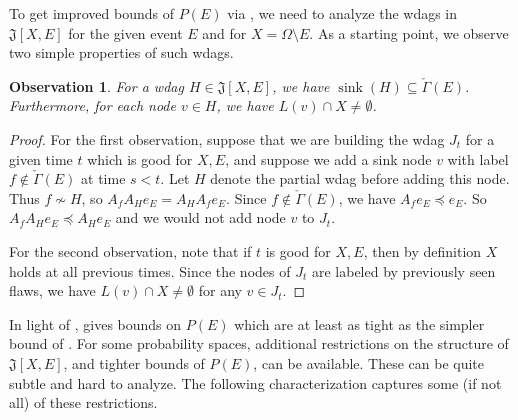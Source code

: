 \documentclass{toc}
\DeclareMathOperator{\sink}{sink}
\newtheorem{observation}[theorem]{Observation}
\begin{document}
To get improved bounds of $P(E)$ via , we need to analyze the wdags in $\mathfrak J[X, E]$ for the given event $E$ and for $X = \Omega \setminus E$. As a starting point, we observe two simple properties of such wdags.
\begin{observation}
\label{character-prop0}
For a wdag $H \in \mathfrak J[X,E]$, we have $\sink(H) \subseteq \check \Gamma(E)$. Furthermore, for each node $v \in H$, we have $L(v) \cap X \neq \emptyset$.
\end{observation}
\begin{proof}
For the first observation, suppose that we are building the wdag $J_t$ for a given time $t$ which is good for $X,E$, and suppose we add a sink node $v$ with label $f \notin \check \Gamma(E)$ at time $s < t$. Let $H$ denote the partial wdag before adding this node. Thus $f \not \sim H$, so $A_f A_H e_E = A_H A_f e_E$. Since $f \notin \check \Gamma(E)$, we have $A_f e_E \preceq e_E$. So $A_f A_H e_E \preceq A_H e_E$ and we would not add node $v$ to $J_t$.

For the second observation, note that if $t$ is good for $X, E$,  then by definition $X$ holds at all previous times. Since the nodes of $J_t$ are labeled by previously seen flaws, we have $L(v) \cap  X \neq \emptyset$ for any $v \in J_t$.
\end{proof}

In light of ,   gives bounds on $P(E)$ which are at least as tight as the simpler bound of .  For some probability spaces, additional restrictions on the structure of $\mathfrak J[X,E]$, and tighter bounds of $P(E)$, can be available. These can be quite subtle and hard to analyze. The following characterization captures some (if not all) of these restrictions.  
\end{document}

